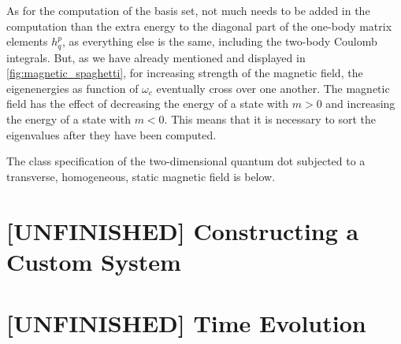 As for the computation of the basis set, not much needs to be added in the computation 
than the extra energy to the diagonal part of the one-body matrix elements $h^p_q$, as 
everything else is the same, including the two-body Coulomb integrals. But, as we have 
already mentioned and displayed in \autoref{fig:magnetic_spaghetti}, for increasing 
strength of the magnetic field, the eigenenergies as function  of $\omega_c$ eventually 
cross over one another. The magnetic field has the effect of decreasing the energy of
a state with $m>0$ and increasing the energy of a state with $m<0$. This means that 
it is necessary to sort the eigenvalues after they have been computed. 

The class specification of the two-dimensional quantum dot subjected to a transverse,
homogeneous, static magnetic field is below.


\section{[UNFINISHED] Constructing a Custom System}

\section{[UNFINISHED] Time Evolution}

